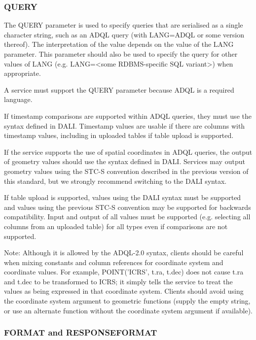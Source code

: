 \documentclass[11pt,letter]{ivoa}
\begin{document}
\subsubsection{QUERY}
\label{sec:QUERY}

The QUERY parameter is used to specify queries that are serialised as a single character string, such as an ADQL query (with LANG=ADQL or some version thereof). The  interpretation
of the value depends on the value of the LANG parameter. This parameter should also be used to 
specify the query for other values of LANG (e.g. LANG=<some RDBMS-specific SQL 
variant>) when appropriate.

A service must support the QUERY parameter because ADQL is a required language.

If timestamp comparisons are supported within ADQL queries, they must use the syntax 
defined in DALI. Timestamp values are usable if there are columns with timestamp values, 
including in uploaded tables if table upload is supported.

If the service supports the use of spatial coordinates in ADQL queries, the output of 
geometry values should use the syntax defined in DALI. Services may output geometry values
using the STC-S convention described in the previous version of this standard, but we 
strongly recommend switching to the DALI syntax. 

If table upload is supported, values using the DALI syntax must be supported and values using 
the previous STC-S convention may be supported for backwards compatibility. Input and output of 
all values must be supported (e.g. selecting all columns from an uploaded table) for all types 
even if comparisons are not supported.

Note: Although it is allowed by the ADQL-2.0 syntax, clients should be careful when 
mixing constants and column references for coordinate system and coordinate 
values. For example, POINT('ICRS', t.ra, t.dec) does not cause t.ra and t.dec to 
be transformed to ICRS; it simply tells the service to treat the values  as 
being expressed in that coordinate system. Clients should avoid using the coordinate 
system argument to geometric functions (supply the empty string, or use an 
alternate function without the coordinate system argument if available).

\subsubsection{FORMAT and RESPONSEFORMAT}
\label{sec:RESPONSEFORMAT}
\end{document}
